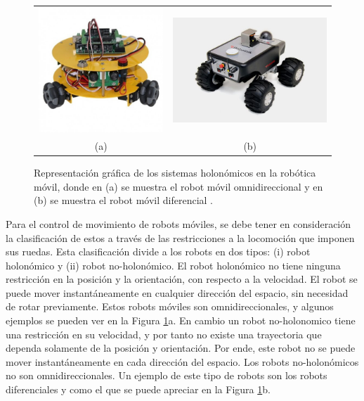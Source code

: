 \begin{figure}%
      \begin{tabular}{cc}
        \includegraphics[width=.40\textwidth]{images/omnidirecional.jpg}&
        \includegraphics[width=.50\textwidth]{images/RM_noHolonomic.jpg}\\
        (a)&(b)
    \end{tabular}
  \captionsetup{font=footnotesize}
    \caption[Representación gráfica de los sistemas holonómicos en la robótica
    móvil, donde en (a) se muestra el robot móvil omnidireccional y en (b) se 
    muestra el robot móvil diferencial.]{Representación gráfica de los sistemas 
    holonómicos en la robótica móvil, donde en (a) se muestra el robot móvil 
    omnidireccional \cite{Omniwheel2018} y en (b) se muestra el robot móvil 
    diferencial \cite{NoHolonomic2018}.}
    \label{f:sLocomocion}
\end{figure}
Para el control de movimiento de robots móviles, se debe tener en consideración 
la clasificación de estos a través de las restricciones a la locomoción que imponen 
sus ruedas. Esta clasificación divide a los robots en dos tipos: (i) robot holonómico 
y (ii) robot no-holonómico. El robot holonómico 
no tiene ninguna restricción en la posición y la orientación, con respecto a la 
velocidad. El robot se puede mover instantáneamente en cualquier dirección 
del espacio, sin necesidad de rotar previamente. Estos robots 
móviles son omnidireccionales, y algunos ejemplos se pueden ver en la Figura 
\ref{f:sLocomocion}a. En cambio un robot no-holonomico tiene una restricción 
en su velocidad, y por tanto no existe una trayectoria que dependa solamente de la 
posición y orientación. Por ende, este robot no se puede mover instantáneamente en cada 
dirección del espacio. Los robots no-holonómicos no son omnidireccionales. Un ejemplo de 
este tipo de robots son los robots diferenciales y como el que se puede apreciar en 
la Figura \ref{f:sLocomocion}b.

